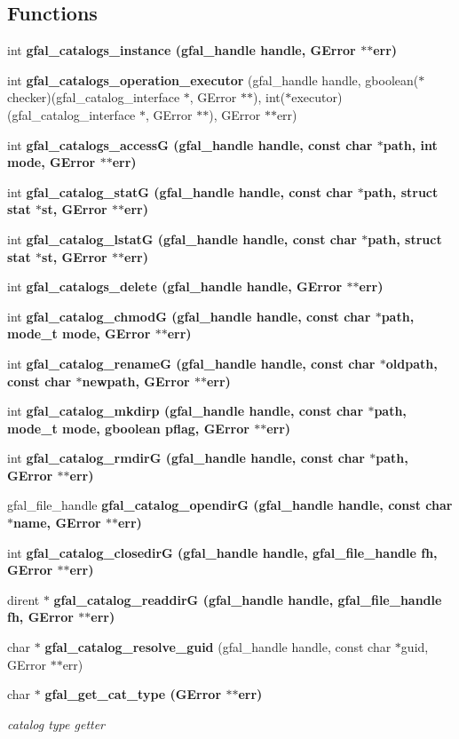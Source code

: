 \subsection*{Functions}
\begin{CompactItemize}
\item 
int \bf{gfal\_\-catalogs\_\-instance} (gfal\_\-handle handle, GError $\ast$$\ast$err)
\item 
int \textbf{gfal\_\-catalogs\_\-operation\_\-executor} (gfal\_\-handle handle, gboolean($\ast$checker)(gfal\_\-catalog\_\-interface $\ast$, GError $\ast$$\ast$), int($\ast$executor)(gfal\_\-catalog\_\-interface $\ast$, GError $\ast$$\ast$), GError $\ast$$\ast$err)\label{gfal__common__catalog_8c_50865ab5cba98b1c7e7f48d982120e3d}

\item 
int \bf{gfal\_\-catalogs\_\-access\-G} (gfal\_\-handle handle, const char $\ast$path, int mode, GError $\ast$$\ast$err)
\item 
int \bf{gfal\_\-catalog\_\-stat\-G} (gfal\_\-handle handle, const char $\ast$path, struct stat $\ast$st, GError $\ast$$\ast$err)
\item 
int \bf{gfal\_\-catalog\_\-lstat\-G} (gfal\_\-handle handle, const char $\ast$path, struct stat $\ast$st, GError $\ast$$\ast$err)
\item 
int \bf{gfal\_\-catalogs\_\-delete} (gfal\_\-handle handle, GError $\ast$$\ast$err)
\item 
int \bf{gfal\_\-catalog\_\-chmod\-G} (gfal\_\-handle handle, const char $\ast$path, mode\_\-t mode, GError $\ast$$\ast$err)
\item 
int \bf{gfal\_\-catalog\_\-rename\-G} (gfal\_\-handle handle, const char $\ast$oldpath, const char $\ast$newpath, GError $\ast$$\ast$err)
\item 
int \bf{gfal\_\-catalog\_\-mkdirp} (gfal\_\-handle handle, const char $\ast$path, mode\_\-t mode, gboolean pflag, GError $\ast$$\ast$err)
\item 
int \bf{gfal\_\-catalog\_\-rmdir\-G} (gfal\_\-handle handle, const char $\ast$path, GError $\ast$$\ast$err)
\item 
gfal\_\-file\_\-handle \bf{gfal\_\-catalog\_\-opendir\-G} (gfal\_\-handle handle, const char $\ast$name, GError $\ast$$\ast$err)
\item 
int \bf{gfal\_\-catalog\_\-closedir\-G} (gfal\_\-handle handle, gfal\_\-file\_\-handle fh, GError $\ast$$\ast$err)
\item 
dirent $\ast$ \bf{gfal\_\-catalog\_\-readdir\-G} (gfal\_\-handle handle, gfal\_\-file\_\-handle fh, GError $\ast$$\ast$err)
\item 
char $\ast$ \textbf{gfal\_\-catalog\_\-resolve\_\-guid} (gfal\_\-handle handle, const char $\ast$guid, GError $\ast$$\ast$err)\label{gfal__common__catalog_8c_4955825d7c275f3dfae9a57232642370}

\item 
char $\ast$ \bf{gfal\_\-get\_\-cat\_\-type} (GError $\ast$$\ast$err)
\begin{CompactList}\small\item\em catalog type getter \item\end{CompactList}\end{CompactItemize}



